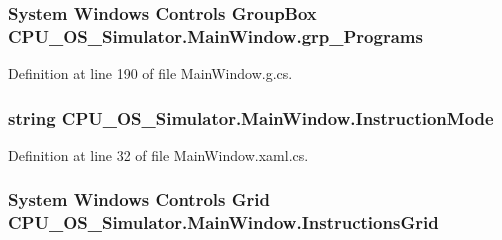 \subsubsection[{grp\+\_\+\+Programs}]{\setlength{\rightskip}{0pt plus 5cm}System Windows Controls Group\+Box C\+P\+U\+\_\+\+O\+S\+\_\+\+Simulator.\+Main\+Window.\+grp\+\_\+\+Programs\hspace{0.3cm}{\ttfamily [package]}}\label{class_c_p_u___o_s___simulator_1_1_main_window_a2cafe5a8b54ae3e95a770abc594519a0}


Definition at line 190 of file Main\+Window.\+g.\+cs.

\hypertarget{class_c_p_u___o_s___simulator_1_1_main_window_a47960653966067f60d901b0dc1897154}{}
\subsubsection[{Instruction\+Mode}]{\setlength{\rightskip}{0pt plus 5cm}string C\+P\+U\+\_\+\+O\+S\+\_\+\+Simulator.\+Main\+Window.\+Instruction\+Mode\hspace{0.3cm}{\ttfamily [private]}}\label{class_c_p_u___o_s___simulator_1_1_main_window_a47960653966067f60d901b0dc1897154}


Definition at line 32 of file Main\+Window.\+xaml.\+cs.

\hypertarget{class_c_p_u___o_s___simulator_1_1_main_window_a2e6841673af413e8a8f8ba8aa0d7c80b}{}
\subsubsection[{Instructions\+Grid}]{\setlength{\rightskip}{0pt plus 5cm}System Windows Controls Grid C\+P\+U\+\_\+\+O\+S\+\_\+\+Simulator.\+Main\+Window.\+Instructions\+Grid\hspace{0.3cm}{\ttfamily [package]}}\label{class_c_p_u___o_s___simulator_1_1_main_window_a2e6841673af413e8a8f8ba8aa0d7c80b}


